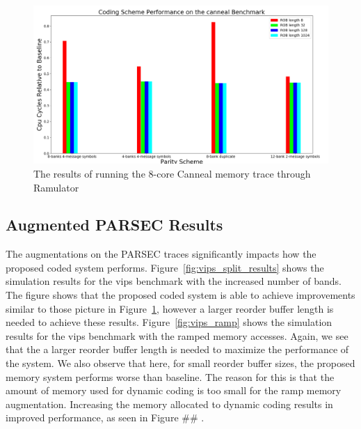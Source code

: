\begin{figure}[h!]
		\includegraphics[width=\linewidth]{figures/canneal_results.png}
		\caption{The results of running the 8-core Canneal memory trace through Ramulator}
		\label{fig:canneal_results}
\end{figure}
		

\subsection{Augmented PARSEC Results}
\label{sec:aug_results}

The augmentations on the PARSEC traces significantly impacts how the proposed coded system performs. Figure~\ref{fig:vips_split_results} shows the simulation results for the vips benchmark with the increased number of bands. The figure shows that the proposed coded system is able to achieve improvements similar to those picture in Figure~\ref{fig:canneal_results}, however a larger reorder buffer length is needed to achieve these results. Figure~\ref{fig:vips_ramp} shows the simulation results for the vips benchmark with the ramped memory accesses. Again, we see that the a larger reorder buffer length is needed to maximize the performance of the system. We also observe that here, for small reorder buffer sizes, the proposed memory system performs worse than baseline. The reason for this is that the amount of memory used for dynamic coding is too small for the ramp memory augmentation. Increasing the memory allocated to dynamic coding results in improved performance, as seen in Figure \#\# .

